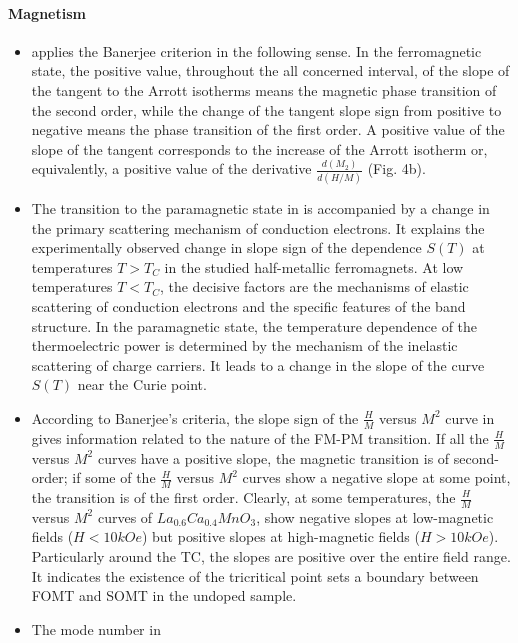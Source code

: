 \documentclass[11pt]{book}
\begin{document}
\paragraph{Magnetism}
\begin{itemize}
\item \cite{trukhanov2011peculiarities}
applies the Banerjee criterion in the following sense. In the ferromagnetic
state, the positive value, throughout the all concerned interval,
of the slope of the tangent to the Arrott isotherms means the magnetic
phase transition of the second order, while the change of the tangent
slope sign from positive to negative means the phase transition of
the first order. A positive value of the slope of the tangent corresponds
to the increase of the Arrott isotherm or, equivalently, a positive
value of the derivative $\frac{d\left(M_{2}\right)}{d\left(H/M\right)}$
(Fig. 4b).
\item The transition to the paramagnetic state in \cite{kourov2015specific}
is accompanied by a change in the primary scattering mechanism of
conduction electrons. It explains the experimentally observed change
in slope sign of the dependence $S\left(T\right)$ at temperatures
$T>T_{C}$ in the studied half-metallic ferromagnets. At low temperatures
$T<T_{C}$, the decisive factors are the mechanisms of elastic scattering
of conduction electrons and the specific features of the band structure.
In the paramagnetic state, the temperature dependence of the thermoelectric
power is determined by the mechanism of the inelastic scattering of
charge carriers. It leads to a change in the slope of the curve $S\left(T\right)$
near the Curie point.
\item According to Banerjee's criteria, the slope sign of
the $\frac{H}{M}$ versus $M^{2}$ curve in \cite{ho2015magnetic}
gives information related to the nature of the FM-PM transition. If
all the $\frac{H}{M}$ versus $M^{2}$ curves have a positive slope,
the magnetic transition is of second-order; if some of the $\frac{H}{M}$
versus $M^{2}$ curves show a negative slope at some point, the transition
is of the first order. Clearly, at some temperatures, the $\frac{H}{M}$
versus $M^{2}$ curves of $La_{0.6}Ca_{0.4}MnO_{3}$, show negative
slopes at low-magnetic fields ($H<10kOe$) but positive slopes at
high-magnetic fields ($H>10kOe$). Particularly around the TC, the
slopes are positive over the entire field range. It indicates the
existence of the tricritical point sets a boundary between FOMT and
SOMT in the undoped sample.
\item The mode number in \cite{mink2016toroidal}

\end{itemize}
\end{document}
